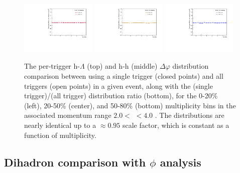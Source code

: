 \begin{figure}[ht]
    \includegraphics[width=0.32\textwidth]{figures/analysis/singletrigger_ratio_0_20.pdf}
    \includegraphics[width=0.32\textwidth]{figures/analysis/singletrigger_ratio_20_50.pdf}
    \includegraphics[width=0.32\textwidth]{figures/analysis/singletrigger_ratio_50_80.pdf}
    \caption{The per-trigger h-$\Lambda$ (top) and h-h (middle) $\Delta\varphi$ distribution comparison between using a single trigger (closed points) and all triggers (open points) in a given event, along with the (single trigger)/(all trigger) distribution ratio (bottom), for the 0-20\% (left), 20-50\% (center), and 50-80\% (bottom) multiplicity bins in the associated momentum range $2.0 <$ \pt $< 4.0$ \GeVc. The distributions are nearly identical up to a $\approx 0.95$ scale factor, which is constant as a function of multiplicity.}
    \label{fig:single_trigger_comp}
\end{figure}

\clearpage

\subsection{Dihadron comparison with $\phi$ analysis}
\label{sec:dihadron_comparison}


